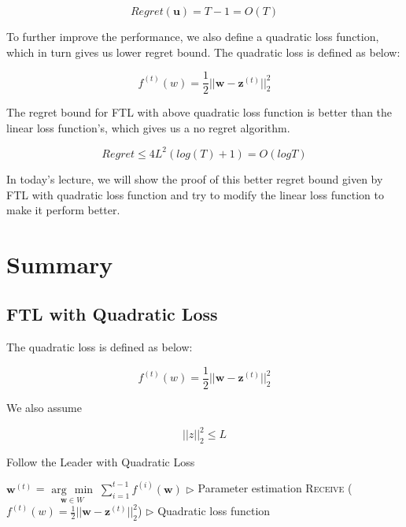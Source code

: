\documentclass[11pt]{article}
\newcommand{\argmin}[1]{\underset{#1}{\operatorname{arg}\,\operatorname{min}}\;}
\begin{document}
\begin{equation*}
    Regret(\bm{u}) = T -1 = O(T)
\end{equation*}

To further improve the performance, we also define a quadratic loss function, which in turn gives us lower regret bound. The quadratic loss is defined as below:

\begin{equation*}
    f^{(t)} (w) = \frac{1}{2}||\bm{w} - \bm{z}^{(t)}||_2^2
\end{equation*}

The regret bound for FTL with above quadratic loss function is better than the linear loss function's, which gives us a no regret algorithm.

\begin{equation*}
    Regret \leq 4L^2 (log(T) + 1) = O(logT)
\end{equation*}

In today's lecture, we will show the proof of this better regret bound given by FTL with quadratic loss function and try to modify the linear loss function to make it perform better.

\section{Summary}
\subsection{FTL with Quadratic Loss}
The quadratic loss is defined as below:

\begin{equation*}
    f^{(t)} (w) = \frac{1}{2}||\bm{w} - \bm{z}^{(t)}||_2^2
\end{equation*}

We also assume 

\begin{equation*}
    ||z||_2^2 \leq L
\end{equation*}


\begin{algorithm}[H]
\caption{Follow the Leader with Quadratic Loss}
\label{algo:FTL_Q}
\begin{algorithmic}[1]

    \STATE $\bm{w}^{(t)}$ = $\argmin{\bm{w} \in W} \sum^{t-1}_{i=1} f^{(i)} (\bm{w})$ \hfill $\triangleright$ Parameter estimation
    \STATE \textsc{Receive} ($f^{(t)} (w) = \frac{1}{2}||\bm{w} - \bm{z}^{(t)}||_2^2$) \hfill $\triangleright$ Quadratic loss function
\ENDFOR

\end{algorithmic}
\end{algorithm}
\end{document}
